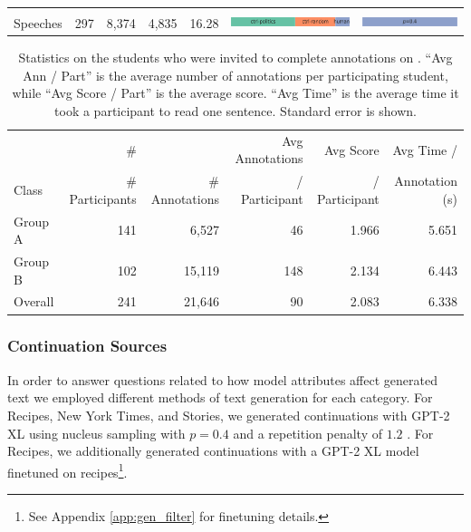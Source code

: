 \begin{table}[tb]
\begin{tabular}{l|r|rr|r|p{2in}|p{1.5in}}
\begin{minipage}{.225\textwidth}
\end{minipage}
\\
Speeches & 297 & 8,374 & 4,835 & 16.28 &
\begin{minipage}{.275\textwidth}
      \includegraphics[height=1em]{figures/model_dist_presidential_speeches}
\end{minipage}
&
\begin{minipage}{.225\textwidth}
      \includegraphics[height=1em]{figures/decoding_dist_presidential_speeches}
\end{minipage}
\\
\bottomrule
\end{tabular}
\end{table}

\begin{table}[tb]
\center
\small
\caption{Statistics on the students who were invited to complete annotations on \ROFT. ``Avg Ann / Part'' is the average number of annotations per participating student,  while ``Avg Score / Part'' is the average score. ``Avg Time'' is the average time it took a participant to read one sentence. Standard error is shown.
}
\label{tab:particpants}
\begin{tabular}{l|rrrrr}
\toprule
      & \#              &                & Avg Annotations & Avg Score     & Avg Time /\\
Class & \# Participants & \# Annotations & / Participant   & / Participant & Annotation (s)\\
\midrule
Group A & 141 & 6,527 & 46 & 1.966 & {5.651} \\
Group B & 102 & 15,119 & 148 & 2.134 & {6.443} \\
\midrule
Overall & 241 & 21,646 & 90 & 2.083 & {6.338} \\
\bottomrule
\end{tabular}
\end{table}

\subsubsection{Continuation Sources}

In order to answer questions related to how model attributes affect generated text we employed different methods of text generation for each category.
For Recipes, New York Times, and Stories, we generated continuations with GPT-2 XL using nucleus sampling \citep{holtzmanetal2020} with $p=0.4$ and a repetition penalty of $1.2$ \citep{keskar2019ctrl}.
For Recipes, we additionally generated continuations with a GPT-2 XL model finetuned on recipes\footnote{See Appendix \ref{app:gen_filter} for finetuning details.}.

